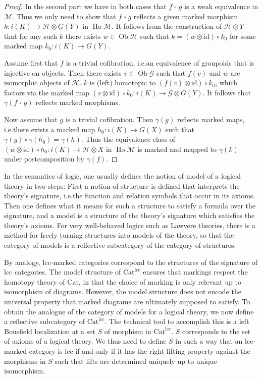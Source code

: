 \documentclass[a4paper]{article}
\theoremstyle{remark}
\theoremstyle{definition}
\begin{document}
\begin{proof}
  In the second part we have in both cases that $f \mathbin{\square} g$ is a weak equivalence in $\mathcal{M}$.
  Thus we only need to show that $f \mathbin{\square} g$ reflects a given marked morphism $k : i(K) \rightarrow \mathcal{H} \otimes G(Y)$ in $\operatorname{Ho} \mathcal{M}$.
  It follows from the construction of $\mathcal{H} \otimes Y$ that for any such $k$ there exists $w \in \operatorname{Ob} \mathcal{H}$ such that $k = (w \otimes \mathrm{id}) \circ k_0$ for some marked map $k_0 : i(K) \rightarrow G(Y)$.

  Assume first that $f$ is a trivial cofibration, i.e.\@ an equivalence of groupoids that is injective on objects.
  Then there exists $v \in \operatorname{Ob} \mathcal{G}$ such that $f(v)$ and $w$ are isomorphic objects of $\mathcal{H}$.
  $k$ is (left) homotopic to $(f(v) \otimes \mathrm{id}) \circ k_0$, which factors via the marked map $(v \otimes \mathrm{id}) \circ k_0 : i(K) \rightarrow \mathcal{G} \otimes G(Y)$.
  It follows that $\gamma(f \mathbin{\square} g)$ reflects marked morphisms.

  Now assume that $g$ is a trivial cofibration.
  Then $\gamma(g)$ reflects marked maps, i.e.\@ there exists a marked map $h_0 : i(K) \rightarrow G(X)$ such that $\gamma(g) \circ \gamma(h_0) = \gamma(h)$.
  Thus the equivalence class of $(w \otimes \mathrm{id}) \circ h_0 : i(K) \rightarrow \mathcal{H} \otimes X$ in $\operatorname{Ho} \mathcal{M}$ is marked and mapped to $\gamma(k)$ under postcomposition by $\gamma(f)$.
\end{proof}

In the semantics of logic, one usually defines the notion of model of a logical theory in two steps:
First a notion of structure is defined that interprets the theory's signature, i.e.\@ the function and relation symbols that occur in its axioms.
Then one defines what it means for such a structure to satisfy a formula over the signature, and a model is a structure of the theory's signature which satisfies the theory's axioms.
For very well-behaved logics such as Lawvere theories, there is a method for freely turning structures into models of the theory, so that the category of models is a reflective subcategory of the category of structures.

By analogy, lcc-marked categories correspond to the structures of the signature of lcc categories.
The model structure of $\mathrm{Cat}^{\mathrm{lcc}}$ ensures that markings respect the homotopy theory of $\mathrm{Cat}$, in that the choice of marking is only relevant up to isomorphism of diagrams.
However, the model structure does not encode the universal property that marked diagrams are ultimately supposed to satisfy.
To obtain the analogue of the category of models for a logical theory, we now define a reflective subcategory of $\mathrm{Cat}^{\mathrm{lcc}}$.
The technical tool to accomplish this is a left Bousfield localization at a set $S$ of morphism in $\mathrm{Cat}^{\mathrm{lcc}}$.
$S$ corresponds to the set of axioms of a logical theory.
We thus need to define $S$ in such a way that an lcc-marked category is lcc if and only if it has the right lifting property against the morphisms in $S$ such that lifts are determined uniquely up to unique isomorphism.
\end{document}
